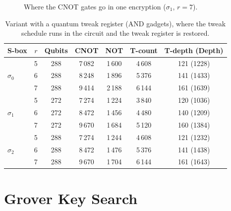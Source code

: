 \documentclass[runningheads,10pt]{llncs}
\begin{document}
\begin{figure}[htbp]
\centering
{}
\caption{Where the CNOT gates go in one encryption ($\sigma_1$, $r=7$).}
\label{fig:cnot-breakdown}
\end{figure}

\begin{table}[htbp]
\centering
\caption{Variant with a quantum tweak register (AND gadgets), where the tweak schedule runs in the circuit and the tweak register is restored.}
\label{tab:quantum-tweak}
\small
\begin{tabular}{lcccccc}
\toprule
S-box & $r$ & Qubits & CNOT & NOT & T-count & T-depth (Depth) \\
\midrule
\multirow{3}{*}{$\sigma_0$} & 5 & 288 & 7\,082 & 1\,600 & 4\,608 & 121 (1228) \\
 & 6 & 288 & 8\,248 & 1\,896 & 5\,376 & 141 (1433) \\
 & 7 & 288 & 9\,414 & 2\,188 & 6\,144 & 161 (1639) \\
\multirow{3}{*}{$\sigma_1$} & 5 & 272 & 7\,274 & 1\,224 & 3\,840 & 120 (1036) \\
 & 6 & 272 & 8\,472 & 1\,456 & 4\,480 & 140 (1209) \\
 & 7 & 272 & 9\,670 & 1\,684 & 5\,120 & 160 (1384) \\
\multirow{3}{*}{$\sigma_2$} & 5 & 288 & 7\,274 & 1\,244 & 4\,608 & 121 (1232) \\
 & 6 & 288 & 8\,472 & 1\,476 & 5\,376 & 141 (1438) \\
 & 7 & 288 & 9\,670 & 1\,704 & 6\,144 & 161 (1643) \\
\bottomrule
\end{tabular}
\end{table}

\section{Grover Key Search}
\label{sec:grover}
\end{document}
